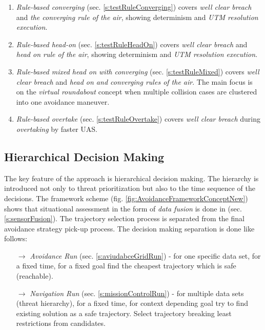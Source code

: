 \begin{enumerate}
    \item \emph{Rule-based converging} (sec. \ref{s:testRuleConverging}) covers \emph{well clear breach} and \emph{the converging rule of the air}, showing determinism and \emph{UTM resolution execution}.
    
    \item \emph{Rule-based head-on} (sec. \ref{s:testRuleHeadOn}) covers \emph{well clear breach} and \emph{head on rule of the air}, showing determinism and \emph{UTM resolution execution}.
    
    \item \emph{Rule-based mixed head on with converging} (sec. \ref{s:testRuleMixed}) covers \emph{well clear breach} and \emph{head on and converging rules of the air}. The main focus is on the \emph{virtual roundabout} concept when multiple collision cases are clustered into one avoidance maneuver. 
    
    \item \emph{Rule-based overtake} (sec. \ref{s:testRuleOvertake}) covers \emph{well clear breach} during \emph{overtaking} by faster UAS.
\end{enumerate}


\subsection{ Hierarchical Decision Making}\label{s:conclusionAvoidanceNavigationRun}
\noindent The key feature of the approach is hierarchical decision making. The hierarchy is introduced not only to threat prioritization but also to the time sequence of the decisions. The framework scheme (fig. \ref{fig:AvoidanceFrameworkConceptNew}) shows that situational assessment in the form of \emph{data fusion} is done in (sec. \ref{s:sensorFusion}). The trajectory selection process is separated from the final avoidance strategy pick-up process. The decision making separation is done like follows:

\begin{itemize}
    \item[$\to$] \emph{Avoidance Run} (sec. \ref{s:aviudabceGridRun}) - for one specific data set, for a fixed time, for a fixed goal find the cheapest trajectory which is safe (reachable).
    
    \item[$\to$] \emph{Navigation Run} (sec. \ref{s:missionControlRun}) - for multiple data sets (threat hierarchy), for a fixed time, for context depending goal try to find existing solution as a safe trajectory. Select trajectory breaking least restrictions from candidates.
\end{itemize}

